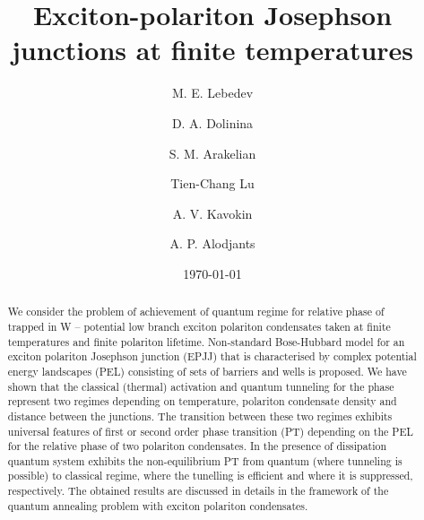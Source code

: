 \documentclass[aps, pre, preprint, groupedaddress, superscriptaddress, showkeys, showpacs] {revtex4-1}
\newcommand{\blue}{\color{blue}}
\begin{document}
\title{{Exciton-polariton Josephson junctions at finite temperatures}}

\author{M. E. Lebedev}

\author{D. A. Dolinina}

\author{S. M. Arakelian}

\author{Tien-Chang Lu}

\author{A. V. Kavokin}

\author{A. P. Alodjants}

\date{\today}

\begin{abstract}
We consider the problem of achievement of quantum regime for relative phase of trapped in W -- potential low branch exciton polariton condensates taken at finite temperatures and finite polariton lifetime.
Non-standard Bose-Hubbard model for an exciton polariton Josephson junction (EPJJ) that is characterised by complex potential energy landscapes (PEL) consisting of sets of barriers and wells is proposed.
We have shown that the classical (thermal) activation and quantum tunneling for the phase represent two regimes depending on temperature, polariton condensate density and distance between the junctions.
The transition between these two regimes exhibits universal features of first or second order phase transition (PT) depending on the PEL for the relative phase of two polariton condensates.
In the presence of dissipation quantum system exhibits the non-equilibrium PT from quantum {\blue (where tunneling is possible)} to classical regime, where the tunelling is efficient and where it is suppressed, respectively.
The obtained results are discussed in details in the framework of the quantum annealing problem with exciton polariton condensates.   
 
\end{abstract}
\end{document}
